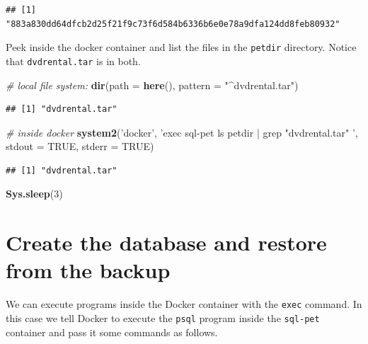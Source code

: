 \documentclass[]{book}
\newenvironment{Shaded}{\begin{snugshade}}{\end{snugshade}}
\newcommand{\CommentTok}[1]{\textcolor[rgb]{0.56,0.35,0.01}{\textit{#1}}}
\newcommand{\DataTypeTok}[1]{\textcolor[rgb]{0.13,0.29,0.53}{#1}}
\newcommand{\DecValTok}[1]{\textcolor[rgb]{0.00,0.00,0.81}{#1}}
\newcommand{\KeywordTok}[1]{\textcolor[rgb]{0.13,0.29,0.53}{\textbf{#1}}}
\newcommand{\NormalTok}[1]{#1}
\newcommand{\OtherTok}[1]{\textcolor[rgb]{0.56,0.35,0.01}{#1}}
\newcommand{\StringTok}[1]{\textcolor[rgb]{0.31,0.60,0.02}{#1}}
\theoremstyle{definition}
\theoremstyle{definition}
\theoremstyle{definition}
\theoremstyle{remark}
\begin{document}
\begin{verbatim}
## [1] "883a830dd64dfcb2d25f21f9c73f6d584b6336b6e0e78a9dfa124dd8feb80932"
\end{verbatim}

Peek inside the docker container and list the files in the
\texttt{petdir} directory. Notice that \texttt{dvdrental.tar} is in
both.

\begin{Shaded}
\begin{Highlighting}[]
\CommentTok{# local file system:}
\KeywordTok{dir}\NormalTok{(}\DataTypeTok{path =} \KeywordTok{here}\NormalTok{(), }\DataTypeTok{pattern =} \StringTok{"^dvdrental.tar"}\NormalTok{)}
\end{Highlighting}
\end{Shaded}

\begin{verbatim}
## [1] "dvdrental.tar"
\end{verbatim}

\begin{Shaded}
\begin{Highlighting}[]
\CommentTok{# inside docker}
\KeywordTok{system2}\NormalTok{(}\StringTok{'docker'}\NormalTok{, }\StringTok{'exec sql-pet ls petdir | grep "dvdrental.tar" '}\NormalTok{,}
        \DataTypeTok{stdout =} \OtherTok{TRUE}\NormalTok{, }\DataTypeTok{stderr =} \OtherTok{TRUE}\NormalTok{)}
\end{Highlighting}
\end{Shaded}

\begin{verbatim}
## [1] "dvdrental.tar"
\end{verbatim}

\begin{Shaded}
\begin{Highlighting}[]
\KeywordTok{Sys.sleep}\NormalTok{(}\DecValTok{3}\NormalTok{)}
\end{Highlighting}
\end{Shaded}

\hypertarget{create-the-database-and-restore-from-the-backup}{%
\section{Create the database and restore from the
backup}\label{create-the-database-and-restore-from-the-backup}}

We can execute programs inside the Docker container with the
\texttt{exec} command. In this case we tell Docker to execute the
\texttt{psql} program inside the \texttt{sql-pet} container and pass it
some commands as follows.
\end{document}
